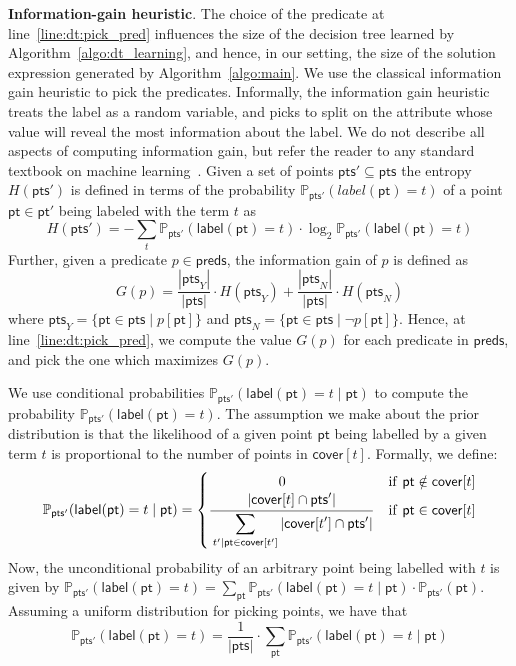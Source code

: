 \documentclass{llncs}
\newcommand\Points{\mathsf{pts}}
\newcommand\Point{\mathsf{pt}}
\newcommand\Predicates{\mathsf{preds}}
\newcommand\Pred{p}
\newcommand\Term{t}
\newcommand\Cover{\mathsf{cover}}
\newcommand\Prob[2]{\mathbb{P}_{#1}(#2)}
\renewcommand{\paragraph}[1]{\par\noindent\textbf{#1}.}
\newcommand{\labl}[1]{\mathsf{label}(#1)}
\begin{document}
\paragraph{Information-gain heuristic}
The choice of the predicate at line~\ref{line:dt:pick_pred} influences
the size of the decision tree learned by
Algorithm~\ref{algo:dt_learning}, and hence, in our setting, the size of
the solution expression generated by Algorithm~\ref{algo:main}.
We use the classical information gain heuristic to pick the predicates.
Informally, the information gain heuristic treats the label as a random
variable, and picks to split on the attribute whose value will reveal
the most information about the label.
We do not describe all aspects of computing information gain, but
refer the reader to any standard textbook on machine
learning~\cite{bishop-book}.
Given a set of points $\Points' \subseteq \Points$ the entropy
$H(\Points')$ is defined in terms of the probability
$\Prob{\Points'}{label(\Point) = t}$ of a point $\Point \in \Point'$ being
labeled with the term $\Term$ as
\[
H(\Points') = -\sum_{\Term} \Prob{\Points'}{\labl{\Point} = \Term} \cdot \log_2{\Prob{\Points'}{\labl{\Point} = \Term}}
\]
Further, given a predicate $\Pred \in \Predicates$, the information
gain of $\Pred$ is defined as
\[
G(\Pred) = \frac{|\Points_{Y}|}{|\Points|} \cdot
H(\Points_{Y}) + \frac{|\Points_{N}|}{|\Points|} \cdot
H(\Points_{N})
\]
where $\Points_{Y} = \{\Point \in \Points \mid \Pred[\Point]\}$ and
$\Points_{N} = \{\Point \in \Points \mid \neg\Pred[\Point]\}$.
Hence, at line~\ref{line:dt:pick_pred}, we compute the value $G(\Pred)$
for each predicate in $\Predicates$, and pick the one which maximizes
$G(\Pred)$.

We use conditional probabilities $\Prob{\Points'}{\labl{\Point} = \Term \mid
\Point}$ to compute the probability $\Prob{\Points'}{\labl{\Point} = t}$.
The assumption we make about the prior distribution is that the
likelihood of a given point $\Point$ being labelled by a given term
$\Term$ is proportional to the number of points in $\Cover[\Term]$.
Formally, we define:
\[
    \Prob{\Points'}{\labl{\Point} = t \mid \Point} =
    \begin{cases}
        \qquad\qquad\quad 0  & \mathrm{if}\ \Point \notin \Cover[\Term]\\
      \displaystyle
      \frac{\strut\displaystyle\vert \Cover[\Term] \cap \Points' \vert}{\strut\displaystyle\sum_{\Term'
          | \Point \in \Cover[\Term']} \vert \Cover[\Term'] \cap \Points' \vert } & \mathrm{if}\
      \Point \in \Cover[\Term] \\
    \end{cases}
\]
Now, the unconditional probability of an arbitrary point being labelled
with $\Term$ is given by $\Prob{\Points'}{\labl{\Point} = \Term} = \sum_{\Point}
\Prob{\Points'}{\labl{\Point} = \Term \mid \Point}\cdot\Prob{\Points'}{\Point}$.
Assuming a uniform distribution for picking points, we have that
\[
    \Prob{\Points'}{\labl{\Point} = t} =  \frac{1}{\vert \Points \vert} \cdot \sum_{\Point} \Prob{\Points'}{\labl{\Point} = \Term \mid \Point}
\]
\end{document}
